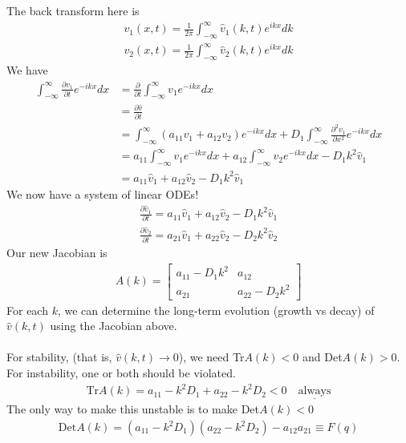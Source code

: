 \documentclass[12pt, letterpaper]{article}
\begin{document}
The back transform here is 
\begin{align*}
    v_1(x,t) = \frac{1}{2\pi} \int_{-\infty}^{\infty} \hat v_1 (k,t) e^{ikx} dk \\
    v_2(x,t) = \frac{1}{2\pi} \int_{-\infty}^{\infty} \hat v_2 (k,t) e^{ikx} dk
\end{align*}
We have 
\begin{align*}
    \int_{-\infty}^{\infty} \frac{\partial v_1}{\partial t} e^{-ikx}dx &= \frac{\partial}{\partial t} \int_{-\infty}^{\infty} v_1e^{-ikx}dx  \\
    &= \frac{\partial \hat v}{\partial t} \\
    &= \int_{-\infty}^{\infty} (a_{11} v_1 + a_{12} v_2) e^{-ikx} dx + D_1 \int_{-\infty}^{\infty}\frac{\partial^2 v_1}{\partial x^2} e^{-ikx}dx \\
    &= a_{11} \int_{-\infty}^{\infty} v_1 e^{-ikx} dx + a_{12} \int_{-\infty}^{\infty} v_2 e^{-ikx} dx - D_1 k^2\hat v_1 \\
    &= a_{11} \hat v_1 + a_{12} \hat v_2 - D_1 k^2 \hat v_1
\end{align*}
We now have a system of linear ODEs!
\begin{align*}
    \frac{\partial \hat v_1}{\partial t} = a_{11} \hat v_1 + a_{12} \hat v_2 - D_1 k^2 \hat v_1 \\
    \frac{\partial \hat v_2}{\partial t} = a_{21} \hat v_1 + a_{22} \hat v_2 - D_2 k^2 \hat v_2
\end{align*}
Our new Jacobian is 
\begin{align*}
    A(k) = \begin{bmatrix}
        a_{11}-D_1k^2 & a_{12} \\
        a_{21} & a_{22} - D_2 k^2
    \end{bmatrix}
\end{align*}
For each $k$, we can determine the long-term evolution (growth vs decay) of $\hat v(k,t)$
using the Jacobian above. \\ \\
For stability, (that is, $\hat v(k,t) \rightarrow 0$), we need Tr$A(k) < 0$ and Det$A(k) > 0$. \\
For instability, one or both should be violated. 
\begin{align*}
    \text{Tr}A(k) = a_{11} - k^2D_1 + a_{22} - k^2D_2 < 0\quad \underline{\text{always}}
\end{align*}
The only way to make this unstable is to make Det$A(k) < 0$
\begin{align*}
    \text{Det}A(k) = (a_{11}-k^2D_1)(a_{22}-k^2D_2)-a_{12}a_{21} \equiv F(q)
\end{align*} 
\end{document}
